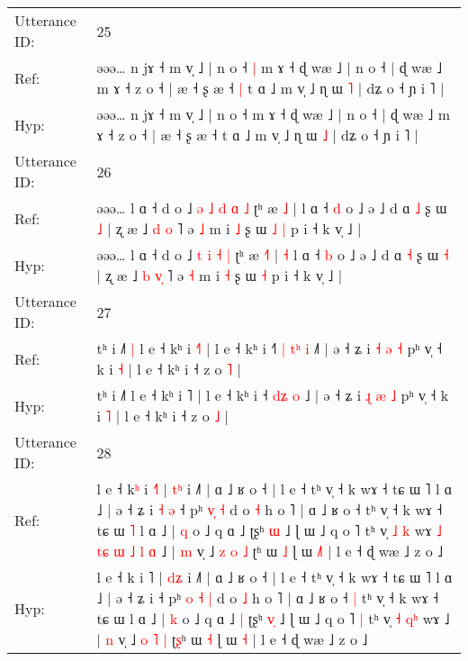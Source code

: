 \documentclass[10pt]{article}
\DeclareRobustCommand{\hl}[1]{{\textcolor{red}{#1}}}
\begin{document}
\begin{longtable}{ll}
\midrule
Utterance ID: & 25 \\
Ref: & əəə… n jɤ ˧ m v̩ ˩ | n o ˧\hl{ }\hl{|} m ɤ ˧ ɖ wæ ˩ | n o ˧ | ɖ wæ ˩ m ɤ ˧ z o ˧ | æ ˧ ʂ æ ˧\hl{ }\hl{|} t ɑ ˩ m v̩ ˩ ɳ ɯ \hl{˥} | dʑ o ˧ ɲ i ˥ |
 \\
Hyp: & əəə… n jɤ ˧ m v̩ ˩ | n o ˧\hl{}\hl{} m ɤ ˧ ɖ wæ ˩ | n o ˧ | ɖ wæ ˩ m ɤ ˧ z o ˧ | æ ˧ ʂ æ ˧\hl{}\hl{} t ɑ ˩ m v̩ ˩ ɳ ɯ \hl{˩} | dʑ o ˧ ɲ i ˥ |
 \\
\midrule
Utterance ID: & 26 \\
Ref: & əəə… l ɑ ˧ d o ˩\hl{ }\hl{ə} \hl{˩} \hl{d} \hl{ɑ} \hl{˩} ʈʰ æ \hl{}\hl{˩} |\hl{}\hl{} l ɑ ˧ \hl{d} o ˩ ə ˩ d ɑ \hl{˩} ʂ ɯ \hl{˩} | ʐ æ ˩ \hl{d} \hl{}\hl{o} ˥ ə \hl{˩} m i \hl{˩} ʂ ɯ\hl{ }\hl{˩} \hl{|} p i ˧ k v̩ ˩ |
 \\
Hyp: & əəə… l ɑ ˧ d o ˩\hl{}\hl{} \hl{t} \hl{i} \hl{˧} \hl{|} ʈʰ æ \hl{˧}\hl{˥} |\hl{ }\hl{˧} l ɑ ˧ \hl{b} o ˩ ə ˩ d ɑ \hl{˧} ʂ ɯ \hl{˧} | ʐ æ ˩ \hl{b} \hl{v}\hl{̩} ˥ ə \hl{˧} m i \hl{˧} ʂ ɯ\hl{}\hl{} \hl{˧} p i ˧ k v̩ ˩ |
 \\
\midrule
Utterance ID: & 27 \\
Ref: & tʰ i ˩˥\hl{ }\hl{|} l e ˧ kʰ i \hl{˧}˥ | l e ˧ kʰ i ˧\hl{˥}\hl{ }\hl{|} \hl{t}\hl{ʰ} \hl{i} ˩\hl{˥} | ə ˧ ʑ i \hl{˧} \hl{ə} \hl{˧} pʰ v̩ ˧ k i \hl{˧} | l e ˧ kʰ i ˧ z o \hl{˥} |
 \\
Hyp: & tʰ i ˩˥\hl{}\hl{} l e ˧ kʰ i \hl{}˥ | l e ˧ kʰ i ˧\hl{}\hl{}\hl{} \hl{d}\hl{ʑ} \hl{o} ˩\hl{} | ə ˧ ʑ i \hl{ɻ} \hl{æ} \hl{˩} pʰ v̩ ˧ k i \hl{˥} | l e ˧ kʰ i ˧ z o \hl{˩} |
 \\
\midrule
Utterance ID: & 28 \\
Ref: & l e ˧ k\hl{ʰ} i \hl{˧}˥ | \hl{t}\hl{ʰ} i ˩˥ | ɑ ˩ ʁ o ˧ | l e ˧ tʰ v̩ ˧ k wɤ ˧ tɕ ɯ ˥ l ɑ ˩ | ə ˧ ʑ i\hl{ }\hl{˧}\hl{ }\hl{ə} ˧ pʰ \hl{}\hl{v}\hl{̩} \hl{˧} d o \hl{˧} h o ˥ | ɑ ˩ ʁ o ˧\hl{}\hl{} tʰ v̩ ˧ k wɤ ˧ tɕ ɯ\hl{ }\hl{˥} l ɑ ˩ | \hl{q} o ˩ q ɑ ˩\hl{}\hl{} ʈʂʰ \hl{}\hl{ɯ} ˩ ɭ ɯ ˩ q o ˥\hl{}\hl{} tʰ v̩ \hl{˩} \hl{}\hl{k} wɤ\hl{ }\hl{˩}\hl{ }\hl{t}\hl{ɕ}\hl{ }\hl{ɯ}\hl{ }\hl{˩}\hl{ }\hl{l}\hl{ }\hl{ɑ} ˩ | \hl{m} v̩ ˩ \hl{z} \hl{o} \hl{˩} ʈ\hl{}ʰ ɯ \hl{˩} ɭ ɯ \hl{˩}\hl{˥} | l e ˧ ɖ wæ ˩ z o ˩
 \\
Hyp: & l e ˧ k\hl{} i \hl{}˥ | \hl{d}\hl{ʑ} i ˩˥ | ɑ ˩ ʁ o ˧ | l e ˧ tʰ v̩ ˧ k wɤ ˧ tɕ ɯ ˥ l ɑ ˩ | ə ˧ ʑ i\hl{}\hl{}\hl{}\hl{} ˧ pʰ \hl{o}\hl{ }\hl{˧} \hl{|} d o \hl{˩} h o ˥ | ɑ ˩ ʁ o ˧\hl{ }\hl{|} tʰ v̩ ˧ k wɤ ˧ tɕ ɯ\hl{}\hl{} l ɑ ˩ | \hl{k} o ˩ q ɑ ˩\hl{ }\hl{|} ʈʂʰ \hl{v}\hl{̩} ˩ ɭ ɯ ˩ q o ˥\hl{ }\hl{|} tʰ v̩ \hl{˧} \hl{q}\hl{ʰ} wɤ\hl{}\hl{}\hl{}\hl{}\hl{}\hl{}\hl{}\hl{}\hl{}\hl{}\hl{}\hl{}\hl{} ˩ | \hl{n} v̩ ˩ \hl{o} \hl{˥} \hl{|} ʈ\hl{ʂ}ʰ ɯ \hl{˧} ɭ ɯ \hl{}\hl{˧} | l e ˧ ɖ wæ ˩ z o ˩

\end{longtable}
\end{document}
